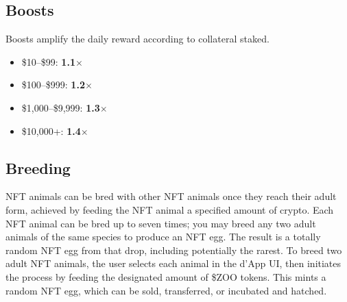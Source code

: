 \subsection{Boosts}

Boosts amplify the daily reward according to collateral staked.
\begin{itemize}
  \item \$10--\$99: \textbf{1.1$\times$}
  \item \$100--\$999: \textbf{1.2$\times$}
  \item \$1{,}000--\$9{,}999: \textbf{1.3$\times$}
  \item \$10{,}000+: \textbf{1.4$\times$}
\end{itemize}

\subsection{Breeding}

NFT animals can be bred with other NFT animals once they reach their adult form, achieved by feeding the NFT animal a specified amount of crypto. Each NFT animal can be bred up to seven times; you may breed any two adult animals of the same species to produce an NFT egg. The result is a totally random NFT egg from that drop, including potentially the rarest. To breed two adult NFT animals, the user selects each animal in the d'App UI, then initiates the process by feeding the designated amount of \$ZOO tokens. This mints a random NFT egg, which can be sold, transferred, or incubated and hatched.
